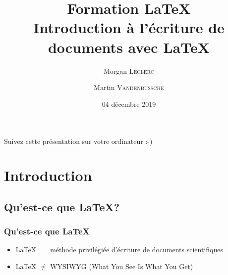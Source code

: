 \documentclass[10pt,svgnames,usenames,table]{beamer} %
\institute{Louvain-li-Nux}
\title{\textbf{Formation \LaTeX}\\
Introduction à l'écriture de documents avec \LaTeX}
\author{Morgan \textsc{Leclerc} \and Martin \textsc{Vandenbussche}}
\date{04 décembre 2019}
\begin{document}
\begin{frame}
  \begin{center}\Large
  Suivez cette présentation sur votre ordinateur :-)

  \vspace{1cm}
  \end{center}
\end{frame}


\begin{frame}
  \maketitle

\end{frame}


\section{Introduction}
\subsection{Qu'est-ce que \LaTeX{}?}
\begin{frame}
\frametitle{Qu'est-ce que \LaTeX}

\begin{itemize}
\item \LaTeX{} $=$ méthode privilégiée d'écriture de documents scientifiques
 \vspace{0.5cm}
\item \LaTeX{} $ \neq$ WYSIWYG (What You See Is What You Get)
\end{itemize}

\end{frame}
\end{document}
